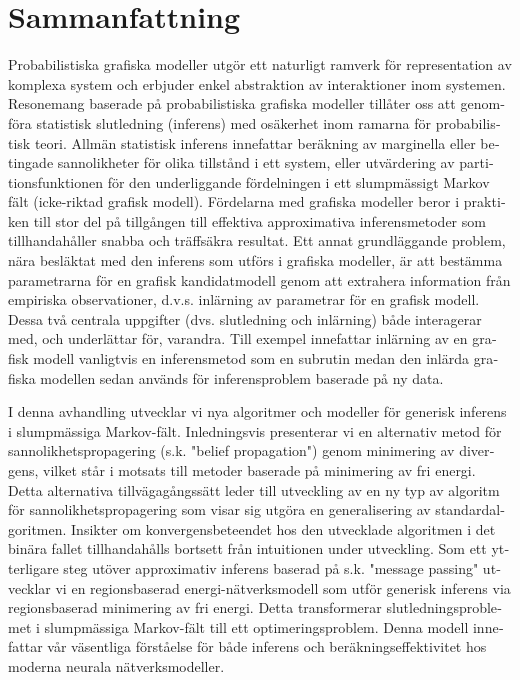 \chapter{Sammanfattning}

\begin{otherlanguage}{swedish}
Probabilistiska grafiska modeller utgör ett naturligt ramverk för representation av komplexa system och erbjuder enkel abstraktion av interaktioner inom systemen.
Resonemang baserade på probabilistiska grafiska modeller tillåter oss att genomföra statistisk slutledning (inferens) med osäkerhet inom ramarna för probabilistisk teori. Allmän statistisk inferens innefattar beräkning av marginella eller betingade sannolikheter för olika tillstånd i ett system, eller utvärdering av partitionsfunktionen för den underliggande fördelningen i ett slumpmässigt Markov fält (icke-riktad grafisk modell). Fördelarna med grafiska modeller beror i praktiken till stor del på tillgången till effektiva approximativa inferensmetoder som tillhandahåller snabba och träffsäkra resultat. Ett annat grundläggande problem, nära besläktat med den inferens som utförs i grafiska modeller, är att bestämma parametrarna för en grafisk kandidatmodell genom att extrahera information från empiriska observationer, d.v.s. inlärning av parametrar för en grafisk modell. Dessa två centrala uppgifter (dvs. slutledning och inlärning) både interagerar med, och underlättar för, varandra. Till exempel innefattar inlärning av en grafisk modell vanligtvis en inferensmetod som en subrutin medan den inlärda grafiska modellen sedan används för inferensproblem baserade på ny data.

I denna avhandling utvecklar vi nya algoritmer och modeller för generisk inferens i slumpmässiga Markov-fält. Inledningsvis presenterar vi en alternativ metod för sannolikhetspropagering (s.k. "belief propagation") genom minimering av divergens, vilket står i motsats till metoder baserade på minimering av fri energi. Detta alternativa tillvägagångssätt leder till utveckling av en ny typ av algoritm för sannolikhetspropagering som visar sig utgöra en generalisering av standardalgoritmen. Insikter om konvergensbeteendet hos den utvecklade algoritmen i det binära fallet tillhandahålls bortsett från intuitionen under utveckling. Som ett ytterligare steg utöver approximativ inferens baserad på s.k. "message passing" utvecklar vi en regionsbaserad energi-nätverksmodell som utför generisk inferens via regionsbaserad  minimering av fri energi. Detta transformerar slutledningsproblemet i slumpmässiga Markov-fält till ett optimeringsproblem. Denna modell innefattar vår väsentliga förståelse för både inferens och beräkningseffektivitet hos moderna neurala nätverksmodeller.


\end{otherlanguage}
